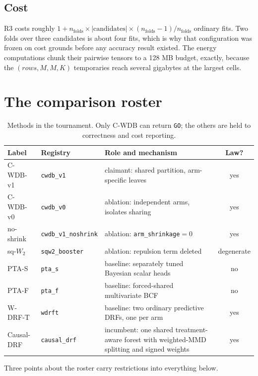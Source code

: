 \documentclass[11pt,a4paper]{article}
\theoremstyle{definition}
\theoremstyle{remark}
\newcommand{\CWDB}{\textsf{C-WDB}}
\begin{document}
\subsection{Cost}

R3 costs roughly $1 + n_{\text{folds}} \times |\text{candidates}| \times
(n_{\text{folds}}-1)/n_{\text{folds}}$ ordinary fits. Two folds over three
candidates is about four fits, which is why that configuration was frozen on cost
grounds before any accuracy result existed. The energy computations chunk their
pairwise tensors to a 128 MB budget, exactly, because the $(rows, M, M, K)$
temporaries reach several gigabytes at the largest cells.

\section{The comparison roster}

\begin{table}[htbp]
\centering
\caption{Methods in the tournament. Only \CWDB{} can return \texttt{GO}; the
others are held to correctness and cost reporting.}
\label{tab:roster}
\small
\begin{tabular}{@{}llp{7.6cm}c@{}}
\toprule
Label & Registry & Role and mechanism & Law? \\
\midrule
C-WDB-v1 & \texttt{cwdb\_v1} & claimant: shared partition, arm-specific leaves & yes \\
C-WDB-v0 & \texttt{cwdb\_v0} & ablation: independent arms, isolates sharing & yes \\
no-shrink & \texttt{cwdb\_v1\_noshrink} & ablation: \texttt{arm\_shrinkage}$=0$ & yes \\
sq-$W_2$ & \texttt{sqw2\_booster} & ablation: repulsion term deleted & degenerate \\
PTA-S & \texttt{pta\_s} & baseline: separately tuned Bayesian scalar heads & no \\
PTA-F & \texttt{pta\_f} & baseline: forced-shared multivariate BCF & no \\
W-DRF-T & \texttt{wdrft} & baseline: two ordinary predictive DRFs, one per arm & yes \\
Causal-DRF & \texttt{causal\_drf} & incumbent: one shared treatment-aware forest with weighted-MMD splitting and signed weights & yes \\
\bottomrule
\end{tabular}
\end{table}

Three points about the roster carry restrictions into everything below.
\end{document}
